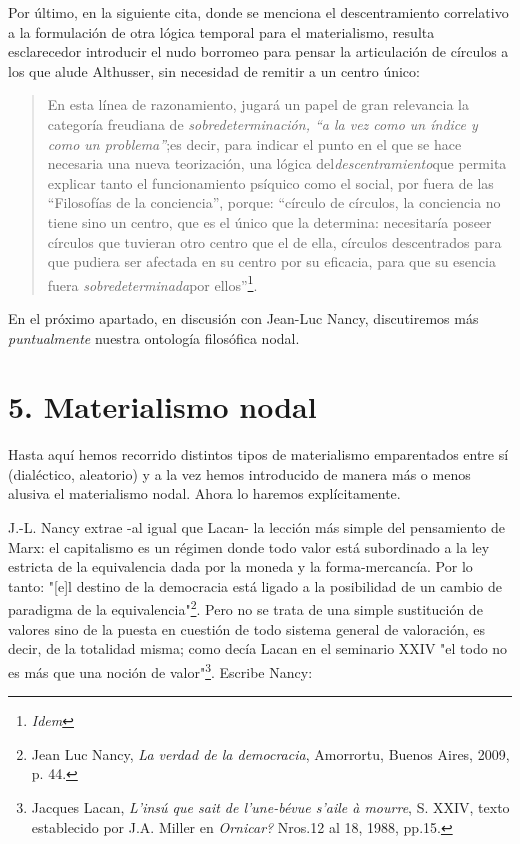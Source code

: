 \documentclass{book}
\begin{document}
Por último, en la siguiente cita, donde se menciona el descentramiento
correlativo a la formulación de otra lógica temporal para el
materialismo, resulta esclarecedor introducir el nudo borromeo para
pensar la articulación de círculos a los que alude Althusser, sin
necesidad de remitir a un centro único:

\begin{quote}
En esta línea de razonamiento, jugará un papel de gran relevancia la
categoría freudiana de \emph{sobredeterminación, ``a la vez como un
índice y como un problema''};es decir, para indicar el punto en el que
se hace necesaria una nueva teorización, una lógica
del\emph{descentramiento}que permita explicar tanto el funcionamiento
psíquico como el social, por fuera de las ``Filosofías de la
conciencia'', porque: ``círculo de círculos, la conciencia no tiene sino
un centro, que es el único que la determina: necesitaría poseer círculos
que tuvieran otro centro que el de ella, círculos descentrados para que
pudiera ser afectada en su centro por su eficacia, para que su esencia
fuera \emph{sobredeterminada}por ellos''\footnote{\emph{Idem}}.
\end{quote}

En el próximo apartado, en discusión con Jean-Luc Nancy, discutiremos
más \emph{puntualmente} nuestra ontología filosófica nodal.

\section{5. Materialismo nodal}

Hasta aquí hemos recorrido distintos tipos de materialismo emparentados
entre sí (dialéctico, aleatorio) y a la vez hemos introducido de manera
más o menos alusiva el materialismo nodal. Ahora lo haremos
explícitamente.

J.-L. Nancy extrae -al igual que Lacan- la lección más simple del
pensamiento de Marx: el capitalismo es un régimen donde todo valor está
subordinado a la ley estricta de la equivalencia dada por la moneda y la
forma-mercancía. Por lo tanto: "{[}e{]}l destino de la democracia está
ligado a la posibilidad de un cambio de paradigma de la
equivalencia"\footnote{Jean Luc Nancy, \emph{La verdad de la
  democracia}, Amorrortu, Buenos Aires, 2009, p. 44.}. Pero no se trata
de una simple sustitución de valores sino de la puesta en cuestión de
todo sistema general de valoración, es decir, de la totalidad misma;
como decía Lacan en el seminario XXIV "el todo no es más que una noción
de valor"\footnote{Jacques Lacan, \emph{L'insú que sait de l'une-bévue
  s'aile à mourre}, S. XXIV, texto establecido por J.A. Miller en
  \emph{Ornicar?} Nros.12 al 18, 1988, pp.15.}. Escribe Nancy:
\end{document}
